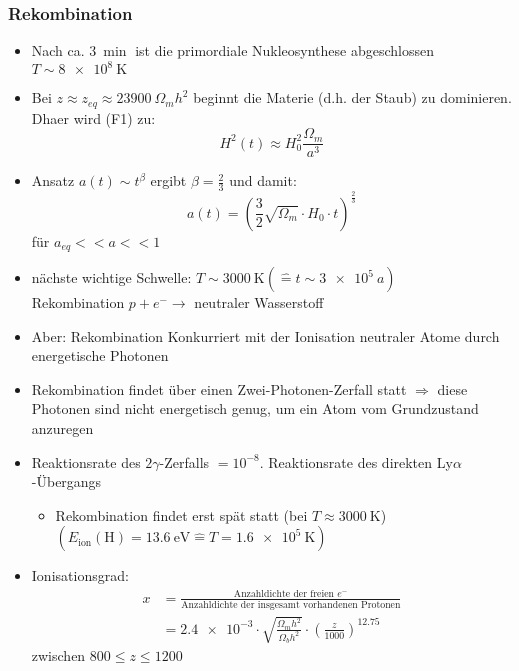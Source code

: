 \subsubsection{Rekombination}
\begin{itemize}
	\item Nach ca. $\SI{3}{\min}$ ist die primordiale Nukleosynthese abgeschlossen $T\sim\SI{8e8}{\K}$
	\item Bei $z\approx z_{eq}\approx\SI{23900}{\Omega_mh^2}$ beginnt die Materie (d.h. der Staub) zu dominieren. Dhaer wird (F1) zu:
		\begin{equation*}
			H^2(t)\approx H_0^2\frac{\Omega_m}{a^3}
		\end{equation*}
	\item Ansatz $a(t)\sim t^\beta$ ergibt $\beta=\frac{2}{3}$ und damit:
		\begin{equation*}
			a(t)=\left(\frac{3}{2}\sqrt{\Omega_m}\cdot H_0\cdot t\right)^\frac{2}{3}
		\end{equation*}
		für $a_{eq}<<a<<1$
	\item nächste wichtige Schwelle: $T\sim\SI{3000}{\K} (\hat{=} t\sim\SI{3e5}{a})$\\
		Rekombination $p+e^-\to$ neutraler Wasserstoff
	\item Aber: Rekombination Konkurriert mit der Ionisation neutraler Atome durch energetische Photonen
	\item Rekombination findet über einen Zwei-Photonen-Zerfall statt $\Rightarrow$ diese Photonen sind nicht energetisch genug, um ein Atom vom Grundzustand anzuregen
	\item Reaktionsrate des $2\gamma$-Zerfalls $=10^{-8}$. Reaktionsrate des direkten Ly$\alpha$-Übergangs
		\begin{itemize}
			\item Rekombination findet erst spät statt (bei $T\approx\SI{3000}{\K}$)\\
				$(E_\text{ion}(\text{H})=\SI{13.6}{\eV}\hat{=}T=\SI{1.6e5}{\K})$
		\end{itemize}
	\item Ionisationsgrad:
		\begin{align*}
			x&=\frac{\text{Anzahldichte der freien } e^-}{\text{Anzahldichte der insgesamt vorhandenen Protonen}}\\
			&=\num{2.4e-3}\cdot\sqrt{\frac{\Omega_mh^2}{\Omega_bh^2}}\cdot\left(\frac{z}{1000}\right)^{\num{12.75}}
		\end{align*}
		zwischen $\num{800}\leq z \leq \num{1200}$\\

\end{itemize}
